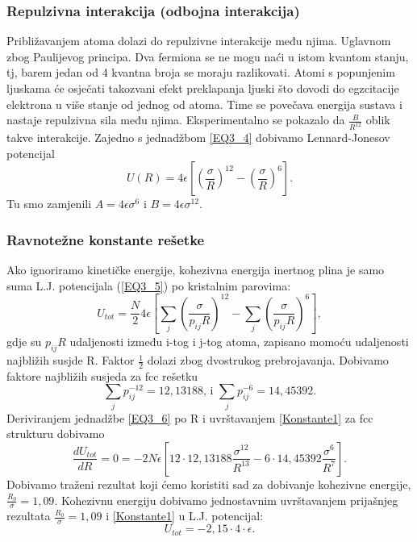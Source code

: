 \documentclass{article}
\numberwithin{equation}{section}
\begin{document}
\subsubsection{Repulzivna interakcija (odbojna interakcija)}
Približavanjem atoma dolazi do repulzivne interakcije među njima. Uglavnom zbog Paulijevog principa. Dva fermiona se ne mogu naći u istom kvantom stanju, tj, barem jedan od 4 kvantna broja se moraju razlikovati. Atomi s popunjenim ljuskama će osječati takozvani efekt preklapanja ljuski što dovodi do egzcitacije elektrona u više stanje od jednog od atoma. Time se povečava energija sustava i nastaje repulzivna sila među njima. Eksperimentalno se pokazalo da $\frac{B}{R^12}$ oblik takve interakcije. Zajedno s jednadžbom \ref{EQ3_4} dobivamo Lennard-Jonesov potencijal
\begin{equation}
    U(R)=4\epsilon\left[\left( \frac{\sigma}{R}\right)^12-\left(\frac{\sigma}{R}\right)^6\right].
    \label{EQ3_5}
\end{equation}
Tu smo zamjenili $A=4\epsilon \sigma^6$ i $B=4\epsilon \sigma^12$.
\subsubsection{Ravnotežne konstante rešetke}
Ako ignoriramo kinetičke energije, kohezivna energija inertnog plina je samo suma L.J. potencijala (\ref{EQ3_5}) po kristalnim parovima: 
\begin{equation}
    U_{tot}=\frac{N}{2}4\epsilon\left[\sum_j \left( \frac{\sigma}{p_{ij}R}\right)^12-\sum_j\left(\frac{\sigma}{p_{ij}R}\right)^6\right],
    \label{EQ3_6}
\end{equation}
gdje su $p_{ij}R$ udaljenosti između i-tog i j-tog atoma, zapisano momoću udaljenosti najbližih susjde R. Faktor $\frac{1}{2}$ dolazi zbog dvostrukog prebrojavanja. Dobivamo faktore najbližih susjeda za fcc rešetku 
\begin{equation}
    \sum_j p^{-12}_{ij} = 12,13188 \text{, i } \sum_j p^{-6}_{ij}=14,45392.
    \label{Konstante1}
\end{equation}
Deriviranjem jednadžbe \ref{EQ3_6} po R i uvrštavanjem \ref{Konstante1} za fcc strukturu dobivamo 
\begin{equation}
    \frac{dU_{tot}}{dR}=0=-2N\epsilon\left[ 12\cdot12,13188 \frac{\sigma^12}{R^13}-6\cdot14,45392 \frac{\sigma^6}{R^7} \right].
    \label{EQ3_7}
\end{equation}
Dobivamo traženi rezultat koji ćemo koristiti sad za dobivanje kohezivne energije, $\frac{R_0}{\sigma}=1,09$. Kohezivnu energiju dobivamo jednostavnim uvrštavanjem prijašnjeg rezultata $\frac{R_0}{\sigma}=1,09$ i \ref{Konstante1} u L.J. potencijal: 
\begin{equation}
    U_{tot}= -2,15\cdot 4 \cdot \epsilon.
\label{EQ3_8}
\end{equation}
\end{document}
